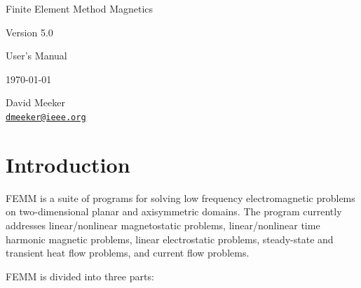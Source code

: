 \documentclass[12pt]{report}
\begin{document}
\thispagestyle{empty}

\vspace*{2.5in}

\vspace*{0.5in}
\begin{center}
{\LARGE Finite Element Method Magnetics}

\vspace*{16pt} {\Large Version 5.0}

\vspace*{16pt} {\Large User's Manual}

\vspace*{16pt} \today

\vspace*{48pt} David Meeker \\
\href{mailto:dmeeker@ieee.org}{\tt dmeeker@ieee.org} \\
\end{center}

\newpage

\tableofcontents

\newpage

\chapter{Introduction}

FEMM is a suite of programs for solving low frequency
electromagnetic problems on two-dimensional planar and axisymmetric
domains.  The program currently addresses linear/nonlinear
magnetostatic problems, linear/nonlinear time harmonic magnetic
problems, linear electrostatic problems, steady-state and transient
heat flow problems, and current flow problems.

FEMM is divided into three parts:
\end{document}
